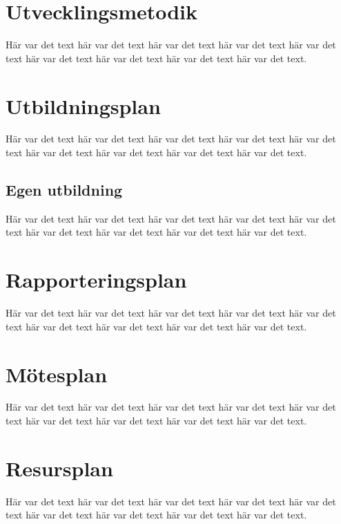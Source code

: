 \documentclass[a4paper,titlepage,12pt]{article}
\begin{document}
	
	\section{Utvecklingsmetodik}
	Här var det text här var det text här var det text
	här var det text här var det text här var det text
	här var det text här var det text här var det text.
	
	
	\section{Utbildningsplan}
	Här var det text här var det text här var det text
	här var det text här var det text här var det text
	här var det text här var det text här var det text.
	
	
	\subsection{Egen utbildning}
	Här var det text här var det text här var det text
	här var det text här var det text här var det text
	här var det text här var det text här var det text.
	
	
	
	
	\section{Rapporteringsplan}
	Här var det text här var det text här var det text
	här var det text här var det text här var det text
	här var det text här var det text här var det text.
	
	
	\section{Mötesplan}
	Här var det text här var det text här var det text
	här var det text här var det text här var det text
	här var det text här var det text här var det text.
	
	
	\section{Resursplan}
	Här var det text här var det text här var det text
	här var det text här var det text här var det text
	här var det text här var det text här var det text.
	
\end{document}
